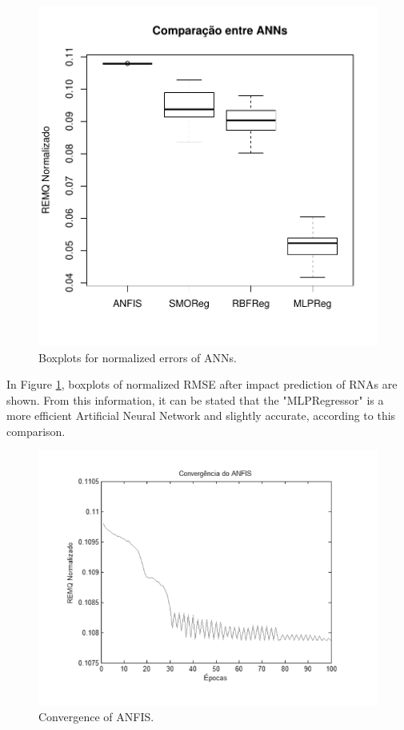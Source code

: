 \begin{figure}[!h]
  \vspace{-0.2cm}
  \centering
  \includegraphics[trim = 1mm 12mm 1mm 1mm,clip,width=0.7\columnwidth]{image/anns_ex4.pdf}
  \caption{Boxplots for normalized errors of ANNs.}
  \label{fig:anns_result}
\end{figure}

In Figure \ref{fig:anns_result}, boxplots of normalized RMSE after impact prediction of RNAs are shown. From this information, it can be stated that the "MLPRegressor" is a more efficient Artificial Neural Network and slightly accurate, according to this comparison.

\begin{figure}[!h]
  \centering
  \includegraphics[trim = 1mm 12mm 1mm 8mm,clip,width=\columnwidth]{image/epocas.png}
  \caption{Convergence of ANFIS.}
  \label{fig:anns_result_2}
\end{figure}

